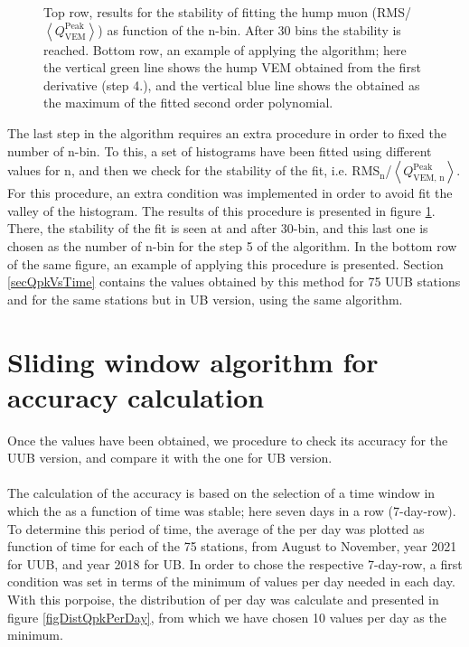 \documentclass[twoside, final, 10pt]{articleMine}
\begin{document}
\begin{figure}[!t]
  \label{figFitStabNbins}
  \centering
  \caption{Top row, results for the stability of fitting the hump
  muon (RMS/$\left<Q^\mathrm{Peak}_\mathrm{VEM}\right>$) as
  function of the n-bin. After 30 bins the stability is reached.
  Bottom row, an example of applying the algorithm; here the
  vertical green line shows the hump VEM obtained from the first
  derivative (step 4.), and the vertical blue line shows the
  \qpkvem obtained as the maximum of the fitted second order
  polynomial.}
  \label{figFitStabNbins}
\end{figure}

The last step in the algorithm requires an extra procedure in
order to fixed the number of n-bin. To this, a set of histograms
have been fitted using different values for n, and then we check
for the stability of the fit, i.e. RMS$_\mathrm{n}$/$\left<
Q^\mathrm{Peak}_\mathrm{VEM,\,n} \right>$. For this procedure, an
extra condition was implemented in order to avoid fit the valley
of the histogram. The results of this procedure is presented in
figure \ref{figFitStabNbins}. There, the stability of the fit
is seen at and after 30-bin, and this last one is chosen as the
number of n-bin for the step 5 of the algorithm. In the bottom
row of the same figure, an example of applying this procedure is
presented. Section \ref{secQpkVsTime} contains the \qpkvem values
obtained by this method for 75 UUB stations and for the same
stations but in UB version, using the same algorithm.

\section{Sliding window algorithm for \qpkvem accuracy
calculation}
\label{secSlidWindowAlgo}
Once the \qpkvem values have been obtained, we procedure to check
its accuracy for the UUB version, and compare it with the one
for UB version.\\\\The calculation of the accuracy is based on
the selection of a time window in which the \qpkvem as a function
of time was stable; here seven days in a row (7-day-row). To
determine this period of time, the average of the \qpkvem per day
was plotted as function of time for each of the 75 stations, from
August to November, year 2021 for UUB, and year 2018 for UB. In
order to chose the respective 7-day-row, a first condition was
set in terms of the minimum of values per day needed in each day.
With this porpoise, the distribution of \qpkvem per day was
calculate and presented in figure \ref{figDistQpkPerDay}, from
which we have chosen 10 \qpkvem values per day as the
minimum.
\clearpage
\end{document}
